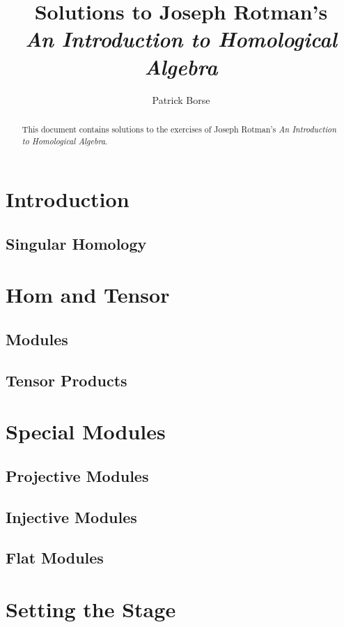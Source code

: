 \documentclass[oneside]{amsbook}
\title{Solutions to Joseph Rotman's\\ \emph{An Introduction to Homological Algebra}}
\author{Patrick Borse}
\begin{document}
\begin{abstract}
This document contains solutions to the exercises of Joseph Rotman's \emph{An Introduction to Homological Algebra}.
\end{abstract}

\maketitle

\tableofcontents

\chapter{Introduction}
\setcounter{section}{2}
\section{Singular Homology}


\chapter{Hom and Tensor}
\section{Modules}

\section{Tensor Products}


\chapter{Special Modules}
\section{Projective Modules}

\section{Injective Modules}

\section{Flat Modules}


\setcounter{chapter}{4}
\chapter{Setting the Stage}
\end{document}

